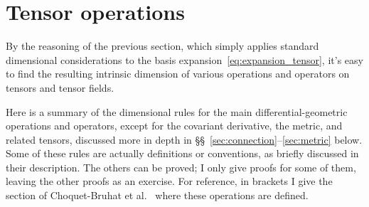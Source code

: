 \documentclass[\ifafour a4paper,12pt,\else a5paper,10pt,\fi%
onecolumn,oneside,article,%
british%
]{memoir}
\theoremstyle{remark}
\theoremstyle{innote}
\newcommand*{\citey}{\parencites*}%
\renewcommand*{\|}[1][]{\nonscript\,#1\vert\nonscript\;\mathopen{}}
\newcommand*{\sects}{\S\S}%
\newcommand*{\etal}{{et al.}}
\newcommand*{\Le}{\textsf{L}}
\newcommand*{\Ti}{\textsf{T}}
\newcommand*{\Cu}{\textsf{I}}
\begin{document}


\section{Tensor operations}
\label{sec:tensor_ops}

By the reasoning of the previous section, which simply applies standard
dimensional considerations to the basis
expansion~\eqref{eq:expansion_tensor}, it's easy to find the resulting
intrinsic dimension of various operations and operators on tensors and
tensor fields.

Here is a summary of the dimensional rules for the main
differential-geometric operations and operators, except for the covariant
derivative, the metric, and related tensors, discussed more in depth in
\sects~\ref{sec:connection}--\ref{sec:metric} below. Some of these rules
are actually definitions or conventions, as briefly discussed in their
description. The others can be proved; I only give proofs for some of them,
leaving the other proofs as an exercise. For reference, in brackets I give
the section of Choquet-Bruhat \etal\ \citey{choquetbruhatetal1977_r1996}
where these operations are defined.
\end{document}
